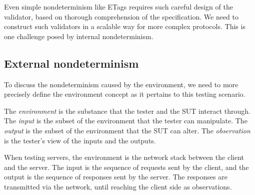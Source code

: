 Even simple nondeterminism like ETags requires such careful design of the
validator, based on thorough comprehension of the specification.  We need to
construct such validators in a scalable way for more complex protocols.  This is
one challenge posed by internal nondeterminism.

\subsection{External nondeterminism}
\label{sec:intro-external-nondet}
To discuss the nondeterminism caused by the environment, we need to more
precisely define the environment concept as it pertains to this testing
scenario.
\begin{definition}
\label{def:environment}
  The {\em environment} is the substance that the tester and the SUT interact
  through.  The {\em input} is the subset of the environment that the tester can
  manipulate.  The {\em output} is the subset of the environment that the SUT
  can alter.  The {\em observation} is the tester's view of the inputs and the
  outputs.
\end{definition}
When testing servers, the environment is the network stack between the client
and the server.  The input is the sequence of requests sent by the client, and
the output is the sequence of responses sent by the server.  The responses are
transmitted via the network, until reaching the client side as observations.

